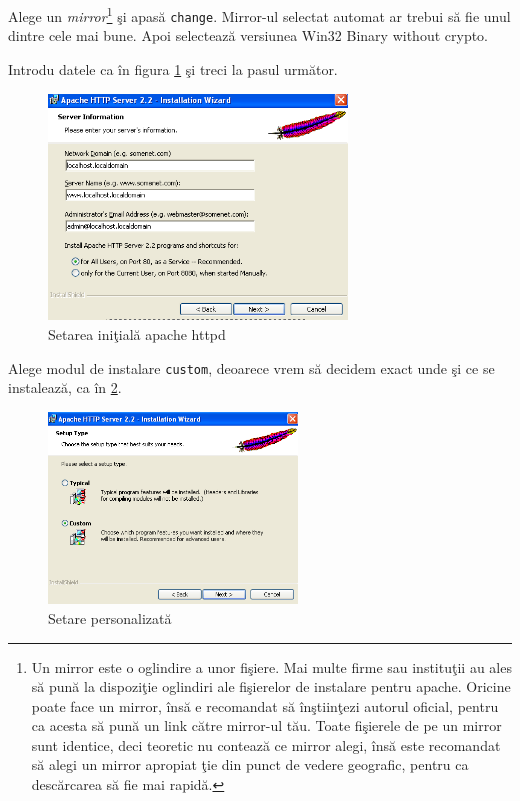 Alege un \textsl{mirror}\footnote{
Un mirror este o oglindire a unor fişiere. Mai multe firme sau instituţii au ales
să pună la dispoziţie oglindiri ale fişierelor de instalare pentru apache. Oricine
poate face un mirror, însă e recomandat să înştiinţezi autorul oficial, pentru
ca acesta să pună un link către mirror-ul tău. Toate fişierele de pe un mirror sunt identice,
deci teoretic nu contează ce mirror alegi, însă este recomandat să alegi un mirror
apropiat ţie din punct de vedere geografic, pentru ca descărcarea să fie mai
rapidă.} şi apasă \texttt{change}. Mirror-ul selectat automat ar trebui să fie unul
dintre cele mai bune. Apoi selectează versiunea {\glqq}Win32 Binary without crypto{\grqq}.


Introdu datele ca în figura \ref{fig:httpd setup} şi treci la pasul următor.

\begin{figure}[h!]
  \centering
    \includegraphics[width=300px]{cap01/Screenshot-2.png}
  \caption{Setarea iniţială apache httpd}
  \label{fig:httpd setup}
\end{figure}

Alege modul de instalare \texttt{custom}, deoarece vrem să decidem exact unde şi ce
se instalează, ca în \ref{fig:httpd check custom setup}.

\begin{figure}[h!]
  \centering
    \includegraphics[width=250px]{cap01/Screenshot-3.png}
  \caption{Setare personalizată}
  \label{fig:httpd check custom setup}
\end{figure}

